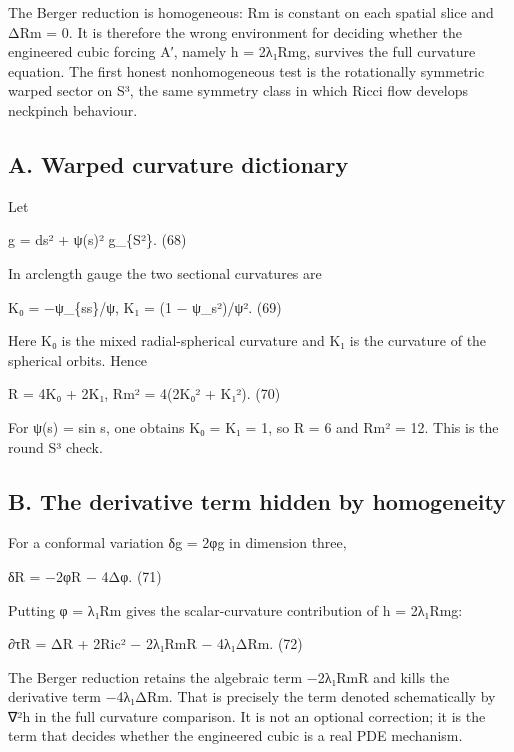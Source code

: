 \documentclass[
]{article}
\begin{document}
The Berger reduction is homogeneous: \textbar Rm\textbar{} is constant on each spatial slice and Δ\textbar Rm\textbar{} = 0. It is therefore the wrong environment for deciding whether the engineered cubic forcing A′, namely h = 2λ₁\textbar Rm\textbar g, survives the full curvature equation. The first honest nonhomogeneous test is the rotationally symmetric warped sector on S³, the same symmetry class in which Ricci flow develops neckpinch behaviour.

\subsection{A. Warped curvature dictionary}\label{a.-warped-curvature-dictionary}

Let

g = ds² + ψ(s)² g\_\{S²\}. (68)

In arclength gauge the two sectional curvatures are

K₀ = −ψ\_\{ss\}/ψ, K₁ = (1 − ψ\_s²)/ψ². (69)

Here K₀ is the mixed radial-spherical curvature and K₁ is the curvature of the spherical orbits. Hence

R = 4K₀ + 2K₁, \textbar Rm\textbar² = 4(2K₀² + K₁²). (70)

For ψ(s) = sin s, one obtains K₀ = K₁ = 1, so R = 6 and \textbar Rm\textbar² = 12. This is the round S³ check.

\subsection{B. The derivative term hidden by homogeneity}\label{b.-the-derivative-term-hidden-by-homogeneity}

For a conformal variation δg = 2φg in dimension three,

δR = −2φR − 4Δφ. (71)

Putting φ = λ₁\textbar Rm\textbar{} gives the scalar-curvature contribution of h = 2λ₁\textbar Rm\textbar g:

∂τR = ΔR + 2\textbar Ric\textbar² − 2λ₁\textbar Rm\textbar R − 4λ₁Δ\textbar Rm\textbar. (72)

The Berger reduction retains the algebraic term −2λ₁\textbar Rm\textbar R and kills the derivative term −4λ₁Δ\textbar Rm\textbar. That is precisely the term denoted schematically by ∇²h in the full curvature comparison. It is not an optional correction; it is the term that decides whether the engineered cubic is a real PDE mechanism.
\end{document}

